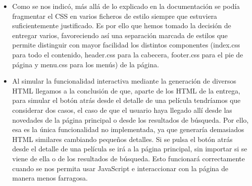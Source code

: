 \documentclass[]{article}
\begin{document}
\begin{itemize}
	\item Como se nos indicó, más allá de lo explicado en la documentación se podía fragmentar el CSS en varios ficheros de estilo siempre que estuviera suficientemente justificado. Es por ello que hemos tomado la decisión de entregar varios, favoreciendo así una separación marcada de estilos que permite distinguir con mayor facilidad los distintos componentes (index.css para todo el contenido, header.css para la cabecera, footer.css para el pie de página y menu.css para los menús) de la página.
	
	\item Al simular la funcionalidad interactiva mediante la generación de diversos HTML llegamos a la conclusión de que, aparte de los HTML de la entrega, para simular el botón atrás desde el detalle de una película tendríamos que considerar dos casos, el caso de que el usuario haya llegado allí desde las novedades de la página principal o desde los resultados de búsqueda. Por ello, esa es la única funcionalidad no implementada, ya que generaría demasiados HTML similares cambiando pequeños detalles. Si se pulsa el botón atrás desde el detalle de una película se irá a la página principal, sin importar si se viene de ella o de los resultados de búsqueda. Esto funcionará correctamente cuando se nos permita usar JavaScript e interaccionar con la página de manera menos farragosa.
\end{itemize}
\end{document}

